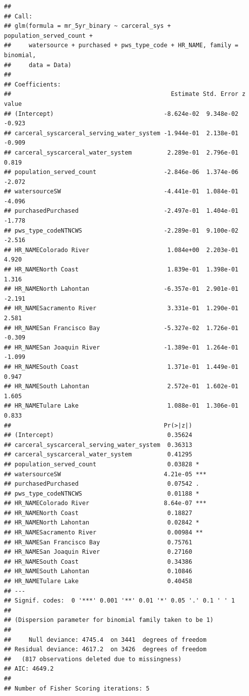 \documentclass[
]{article}
\begin{document}
\begin{verbatim}
## 
## Call:
## glm(formula = mr_5yr_binary ~ carceral_sys + population_served_count + 
##     watersource + purchased + pws_type_code + HR_NAME, family = binomial, 
##     data = Data)
## 
## Coefficients:
##                                             Estimate Std. Error z value
## (Intercept)                               -8.624e-02  9.348e-02  -0.923
## carceral_syscarceral_serving_water_system -1.944e-01  2.138e-01  -0.909
## carceral_syscarceral_water_system          2.289e-01  2.796e-01   0.819
## population_served_count                   -2.846e-06  1.374e-06  -2.072
## watersourceSW                             -4.441e-01  1.084e-01  -4.096
## purchasedPurchased                        -2.497e-01  1.404e-01  -1.778
## pws_type_codeNTNCWS                       -2.289e-01  9.100e-02  -2.516
## HR_NAMEColorado River                      1.084e+00  2.203e-01   4.920
## HR_NAMENorth Coast                         1.839e-01  1.398e-01   1.316
## HR_NAMENorth Lahontan                     -6.357e-01  2.901e-01  -2.191
## HR_NAMESacramento River                    3.331e-01  1.290e-01   2.581
## HR_NAMESan Francisco Bay                  -5.327e-02  1.726e-01  -0.309
## HR_NAMESan Joaquin River                  -1.389e-01  1.264e-01  -1.099
## HR_NAMESouth Coast                         1.371e-01  1.449e-01   0.947
## HR_NAMESouth Lahontan                      2.572e-01  1.602e-01   1.605
## HR_NAMETulare Lake                         1.088e-01  1.306e-01   0.833
##                                           Pr(>|z|)    
## (Intercept)                                0.35624    
## carceral_syscarceral_serving_water_system  0.36313    
## carceral_syscarceral_water_system          0.41295    
## population_served_count                    0.03828 *  
## watersourceSW                             4.21e-05 ***
## purchasedPurchased                         0.07542 .  
## pws_type_codeNTNCWS                        0.01188 *  
## HR_NAMEColorado River                     8.64e-07 ***
## HR_NAMENorth Coast                         0.18827    
## HR_NAMENorth Lahontan                      0.02842 *  
## HR_NAMESacramento River                    0.00984 ** 
## HR_NAMESan Francisco Bay                   0.75761    
## HR_NAMESan Joaquin River                   0.27160    
## HR_NAMESouth Coast                         0.34386    
## HR_NAMESouth Lahontan                      0.10846    
## HR_NAMETulare Lake                         0.40458    
## ---
## Signif. codes:  0 '***' 0.001 '**' 0.01 '*' 0.05 '.' 0.1 ' ' 1
## 
## (Dispersion parameter for binomial family taken to be 1)
## 
##     Null deviance: 4745.4  on 3441  degrees of freedom
## Residual deviance: 4617.2  on 3426  degrees of freedom
##   (817 observations deleted due to missingness)
## AIC: 4649.2
## 
## Number of Fisher Scoring iterations: 5
\end{verbatim}
\end{document}
